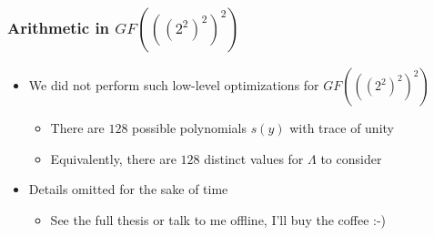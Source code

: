 \documentclass[10pt]{beamer}
\begin{document}
\begin{frame}
	\frametitle{Arithmetic in $GF(((2^2)^2)^2)$}
	\begin{itemize}
		\item We did not perform such low-level optimizations for $GF(((2^2)^2)^2)$
		\begin{itemize}
			\item There are $128$ possible polynomials $s(y)$ with trace of unity
			\item Equivalently, there are $128$ distinct values for $\Lambda$ to consider
		\end{itemize}
		\item Details omitted for the sake of time
		\begin{itemize}
			\item See the full thesis or talk to me offline, I'll buy the coffee :-)
		\end{itemize}
	\end{itemize}
\end{frame}




\end{document}
